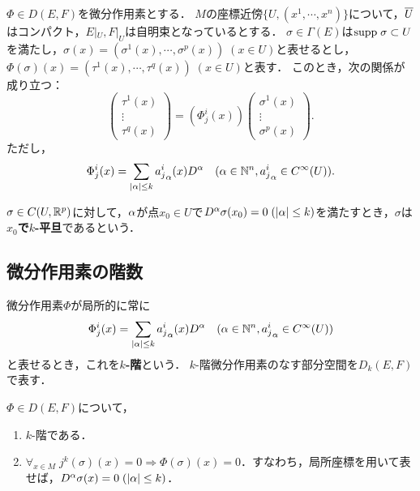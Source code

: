 \documentclass[uplatex,dvipdfmx]{jsreport}
\begin{document}
\begin{theorem}[微分作用素の局所表示]
    $\Phi\in D(E,F)$を微分作用素とする．
    $M$の座標近傍$\{U,(x^1,\cdots,x^n)\}$について，$\overline{U}$はコンパクト，$E|_U,F|_U$は自明束となっているとする．
    $\sigma\in\Gamma(E)$は$\mathrm{supp}\;\sigma\subset U$を満たし，$\sigma(x)=(\sigma^1(x),\cdots,\sigma^p(x))\;(x\in U)$と表せるとし，$\Phi(\sigma)(x)=(\tau^1(x),\cdots,\tau^q(x))\;(x\in U)$と表す．
    このとき，次の関係が成り立つ：
    \[\begin{pmatrix}\tau^1(x)\\\vdots\\\tau^q(x)\end{pmatrix}=(\Phi^i_j(x))\begin{pmatrix}\sigma^1(x)\\\vdots\\\sigma^p(x)\end{pmatrix}.\]
    ただし，
    \[\Phi^i_j(x)=\sum_{\lvert\alpha\rvert\le k}{a^i_j}_\alpha(x)D^\alpha\quad(\alpha\in\mathbb{N}^n,{a^i_j}_\alpha\in C^\infty(U)).\]
\end{theorem}

\begin{definition}
    $\sigma\in C(U,\mathbb{R}^p)$に対して，$\alpha$が点$x_0\in U$で$D^\alpha\sigma(x_0)=0\;(\lvert\alpha\rvert\le k)$を満たすとき，$\sigma$は\textbf{$x_0$で$k$-平旦}であるという．
\end{definition}

\subsection{微分作用素の階数}

\begin{definition}
    微分作用素$\Phi$が局所的に常に
    \[\Phi^i_j(x)=\sum_{\lvert\alpha\rvert\le k}{a^i_j}_\alpha(x)D^\alpha\quad(\alpha\in\mathbb{N}^n,{a^i_j}_\alpha\in C^\infty(U))\]
    と表せるとき，これを\textbf{$k$-階}という．
    $k$-階微分作用素のなす部分空間を$D_k(E,F)$で表す．
\end{definition}

\begin{corollary}
    $\Phi\in D(E,F)$について，
    \begin{enumerate}
        \item $k$-階である．
        \item $\forall_{x\in M}\;j^k(\sigma)(x)=0\Rightarrow\Phi(\sigma)(x)=0$．すなわち，局所座標を用いて表せば，$D^\alpha\sigma(x)=0\;(\lvert\alpha\rvert\le k)$．
    \end{enumerate}
\end{corollary}
\end{document}
